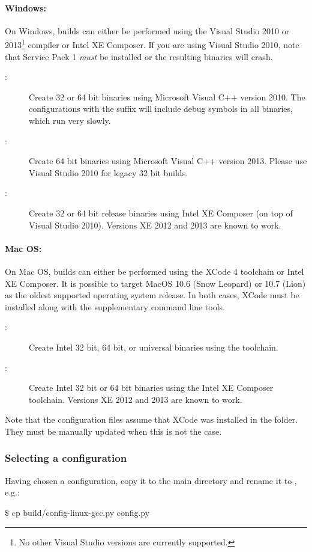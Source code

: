 \paragraph{Windows:}
On Windows, builds can either be performed using the Visual Studio 2010 or 2013\footnote{No other Visual Studio versions are currently supported.}
compiler or Intel XE Composer.
If you are using Visual Studio 2010, note that Service Pack 1 \emph{must} be installed or the resulting binaries will crash.
\begin{description}
\item[:] Create 32 or 64 bit binaries using Microsoft Visual C++ version 2010.
The configurations with the suffix  will include debug symbols in all binaries, which run very slowly.
\item[:] Create 64 bit binaries using Microsoft Visual C++ version 2013. Please use
Visual Studio 2010 for legacy 32 bit builds.
\item[:] Create 32 or 64 bit release binaries using Intel XE Composer (on top of Visual Studio 2010).
Versions XE 2012 and 2013 are known to work.
\end{description}
\paragraph{Mac OS:}
On Mac OS, builds can either be performed using the XCode 4  toolchain or Intel XE Composer.
It is possible to target MacOS 10.6 (Snow Leopard) or 10.7 (Lion) as the oldest supported operating system release.
In both cases, XCode must be installed along with the supplementary command line tools.
\begin{description}
\item[:] Create Intel 32 bit, 64 bit, or universal binaries using the  toolchain.
\item[:] Create Intel 32 bit or 64 bit binaries using the Intel XE Composer toolchain.
Versions XE 2012 and 2013 are known to work.
\end{description}
Note that the configuration files assume that XCode was
installed in the  folder. They must be manually updated
when this is not the case.
\subsubsection{Selecting a configuration}
Having chosen a configuration, copy it to the main directory and rename it to , e.g.:
\begin{shell}
$\texttt{\$}$ cp build/config-linux-gcc.py config.py
\end{shell}

